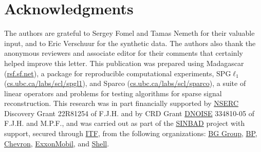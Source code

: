 \section{Acknowledgments}
%
\mbox{}\indent The authors are grateful to Sergey Fomel and Tamas
Nemeth for their valuable input, and to Eric Verschuur for the
synthetic data. The authors also thank the anonymous reviewers and
associate editor for their comments that certainly helped improve this
letter. This publication was prepared using Madagascar
(\url{rsf.sf.net}), a package for reproducible computational
experiments, SPG$\ell_1$ (\url{cs.ubc.ca/labs/scl/spgl1}), and Sparco
(\url{cs.ubc.ca/labs/scl/sparco}), a suite of linear operators and
problems for testing algorithms for sparse signal reconstruction.
This research was in part financially supported by
\href{http://www.nserc.gc.ca/index.htm}{NSERC} Discovery Grant
22R81254 of F.J.H. and by CRD Grant
\href{http://slim.eos.ubc.ca/?module=articles&func=display&catid=43&aid=100}{DNOISE}
334810-05 of F.J.H. and M.P.F., and was carried out as part of the
\href{http://slim.eos.ubc.ca/?module=articles&func=display&catid=22&aid=11}{SINBAD}
project with support, secured through
\href{http://www.oil-itf.com/}{ITF}, from the following organizations:
\href{http://www.bg-group.com/}{BG Group},
\href{http://www.bp.com/}{BP},
\href{http://www.chevron.com/}{Chevron},
\href{http://www.exxonmobil.com/}{ExxonMobil}, and
\href{http://www.shell.com/}{Shell}.






